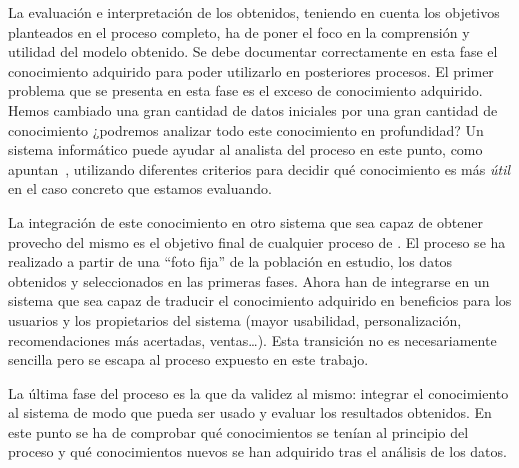 
La evaluación e interpretación de los \patrones obtenidos, teniendo en cuenta los objetivos planteados en el proceso completo, ha de poner el foco en la comprensión y utilidad del modelo obtenido. Se debe documentar correctamente en esta fase el conocimiento adquirido para poder utilizarlo en posteriores procesos. El primer problema que se presenta en esta fase es el exceso de conocimiento adquirido. Hemos cambiado una gran cantidad de datos iniciales por una gran cantidad de conocimiento ¿podremos analizar todo este conocimiento en profundidad? Un sistema informático puede ayudar al analista del proceso en este punto, como apuntan~\citet{LiuHsu-PostAnalysisOfLearnedRules-1996}, utilizando diferentes criterios para decidir qué conocimiento es más \emph{útil} en el caso concreto que estamos evaluando.

La integración de este conocimiento en otro sistema que sea capaz de obtener provecho del mismo es el objetivo final de cualquier proceso de \KDD. El proceso se ha realizado a partir de una "`foto fija"' de la población en estudio, los datos obtenidos y seleccionados en las primeras fases. Ahora han de integrarse en un sistema que sea capaz de traducir el conocimiento adquirido en beneficios para los usuarios y los propietarios del sistema (mayor usabilidad, personalización, recomendaciones más acertadas, ventas\ldots). Esta transición no es necesariamente sencilla pero se escapa al proceso expuesto en este trabajo.

La última fase del proceso es la que da validez al mismo: integrar el conocimiento al sistema de modo que pueda ser usado y evaluar los resultados obtenidos. En este punto se ha de comprobar qué conocimientos se tenían al principio del proceso y qué conocimientos nuevos se han adquirido tras el análisis de los datos.

